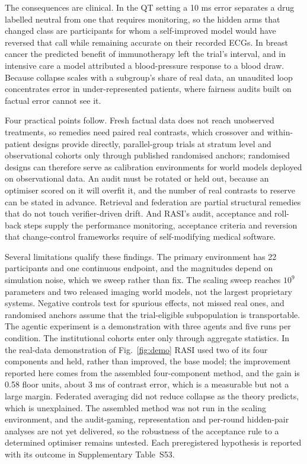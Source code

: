 \documentclass[11pt,a4paper]{article}
\begin{document}
The consequences are clinical. In the QT setting a 10 ms error separates a drug labelled neutral from one that requires monitoring, so the hidden arms that changed class are participants for whom a self-improved model would have reversed that call while remaining accurate on their recorded ECGs. In breast cancer the predicted benefit of immunotherapy left the trial's interval, and in intensive care a model attributed a blood-pressure response to a blood draw. Because collapse scales with a subgroup's share of real data, an unaudited loop concentrates error in under-represented patients, where fairness audits built on factual error cannot see it.

Four practical points follow. Fresh factual data does not reach unobserved treatments, so remedies need paired real contrasts, which crossover and within-patient designs provide directly, parallel-group trials at stratum level and observational cohorts only through published randomised anchors; randomised designs can therefore serve as calibration environments for world models deployed on observational data. An audit must be rotated or held out, because an optimiser scored on it will overfit it, and the number of real contrasts to reserve can be stated in advance. Retrieval and federation are partial structural remedies that do not touch verifier-driven drift. And RASI's audit, acceptance and roll-back steps supply the performance monitoring, acceptance criteria and reversion that change-control frameworks require of self-modifying medical software\cite{fdaPCCP2024,pccpPrinciples2023}.

Several limitations qualify these findings. The primary environment has 22 participants and one continuous endpoint, and the magnitudes depend on simulation noise, which we sweep rather than fix. The scaling sweep reaches $10^9$ parameters and two released imaging world models, not the largest proprietary systems. Negative controls test for spurious effects, not missed real ones, and randomised anchors assume that the trial-eligible subpopulation is transportable. The agentic experiment is a demonstration with three agents and five runs per condition. The institutional cohorts enter only through aggregate statistics. In the real-data demonstration of Fig.~\ref{fig:demo} RASI used two of its four components and held, rather than improved, the base model; the improvement reported here comes from the assembled four-component method, and the gain is 0.58 floor units, about 3 ms of contrast error, which is a measurable but not a large margin. Federated averaging did not reduce collapse as the theory predicts, which is unexplained. The assembled method was not run in the scaling environment, and the audit-gaming, representation and per-round hidden-pair analyses are not yet delivered, so the robustness of the acceptance rule to a determined optimiser remains untested. Each preregistered hypothesis is reported with its outcome in Supplementary Table~S53.
\end{document}
